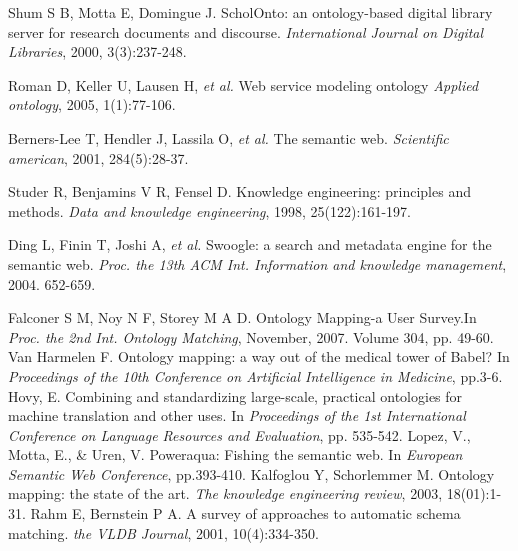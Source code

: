 \documentclass[twoside]{article}
\begin{document}
\begin{multicols}{2}
\begin{thebibliography}{99}
Shum S B, Motta E, Domingue J. ScholOnto: an ontology-based digital library server for research documents and discourse. {\it International Journal on Digital Libraries}, 2000, 3(3):237-248.

Roman D, Keller U, Lausen H, {\it et al.} Web service modeling ontology {\it Applied ontology}, 2005, 1(1):77-106.

Berners-Lee T, Hendler J, Lassila O, {\it et al.} The semantic web. {\it Scientific american}, 2001, 284(5):28-37.

Studer R, Benjamins V R, Fensel D. Knowledge engineering: principles and methods. {\it Data and knowledge engineering}, 1998, 25(122):161-197.

Ding L, Finin T, Joshi A, {\it et al.} Swoogle: a search and metadata engine for the semantic web. {\it Proc. the 13th ACM Int. Information and knowledge management}, 2004. 652-659.

 Falconer S M, Noy N F, Storey M A D. Ontology Mapping-a User Survey.In {\it Proc. the 2nd Int. Ontology Matching}, November, 2007. Volume 304, pp. 49-60.
 Van Harmelen F. Ontology mapping: a way out of the medical tower of Babel? In {\it Proceedings of the 10th Conference on Artificial Intelligence in Medicine}, pp.3-6.
 Hovy, E. Combining and standardizing large-scale, practical ontologies for machine translation and other uses. In {\it Proceedings of the 1st International Conference on Language Resources and Evaluation}, pp. 535-542.
 Lopez, V., Motta, E., \& Uren, V. Poweraqua: Fishing the semantic web. In {\it European Semantic Web Conference}, pp.393-410.
 Kalfoglou Y, Schorlemmer M. Ontology mapping: the state of the art. {\it The knowledge engineering review}, 2003, 18(01):1-31.
 Rahm E, Bernstein P A. A survey of approaches to automatic schema matching. {\it the VLDB Journal}, 2001, 10(4):334-350.



\end{thebibliography}
\end{multicols}
\end{document}
